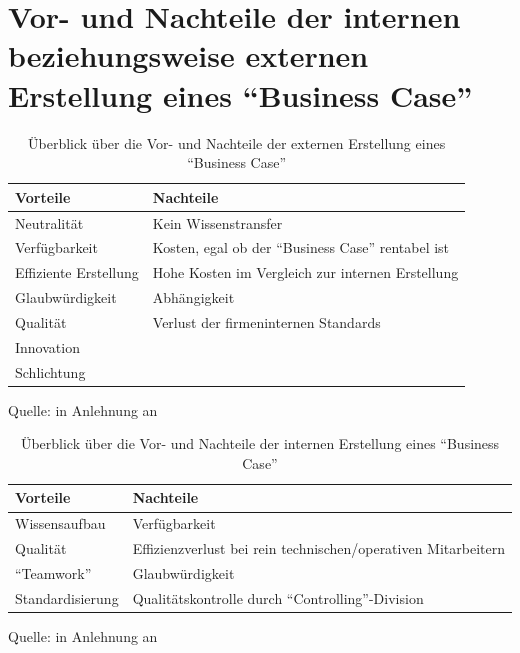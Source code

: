 \section{Vor- und Nachteile der internen beziehungsweise externen Erstellung eines \enquote{Business Case}}\label{appendixVorNachteileErstellungBC}

\begin{table}[h!]
	\centering
	
	\begin{tabular}{@{}ll@{}}\toprule[1.5pt]
		
		\textbf{Vorteile} & \textbf{Nachteile} \\ \midrule
		
		Neutralität & Kein Wissenstransfer \\
		Verfügbarkeit & Kosten, egal ob der \enquote{Business Case} rentabel ist\\
		Effiziente Erstellung & Hohe Kosten im Vergleich zur internen Erstellung \\
		Glaubwürdigkeit & Abhängigkeit \\
		Qualität & Verlust der firmeninternen Standards \\
		Innovation & \\
		Schlichtung & \\
		
		\bottomrule[1.5pt]
	\end{tabular}
	
	\caption{Überblick über die Vor- und Nachteile der externen Erstellung eines \enquote{Business Case}}
	{\footnotesize Quelle: in Anlehnung an \cite[][S.\,34]{brugger_it_2009}}
	\label{tab:externVorNachteile}
	
\end{table}

\begin{table}[h!]
	\centering
	
	\begin{tabular}{@{}ll@{}}\toprule[1.5pt]
		
		\textbf{Vorteile} & \textbf{Nachteile} \\ \midrule
		
		Wissensaufbau & Verfügbarkeit \\
		Qualität & Effizienzverlust bei rein technischen/operativen Mitarbeitern \\
		\enquote{Teamwork} & Glaubwürdigkeit \\
		Standardisierung & Qualitätskontrolle durch \enquote{Controlling}-Division \\
		
		\bottomrule[1.5pt]
	\end{tabular}
	
	\caption{Überblick über die Vor- und Nachteile der internen Erstellung eines \enquote{Business Case}}
	{\footnotesize Quelle: in Anlehnung an \cite[][S.\,34]{brugger_it_2009}}
	\label{tab:internVorNachteile}
	
\end{table}

